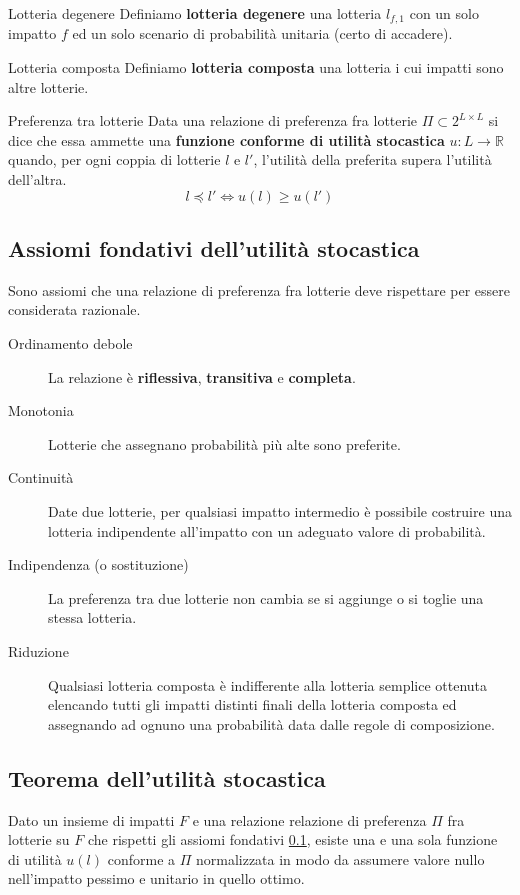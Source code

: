 \documentclass[\main/main.tex]{subfiles}
\begin{document}
\begin{definition}{Lotteria degenere}
  Definiamo \textbf{lotteria degenere} una lotteria $l_{f,1}$ con un solo impatto $f$ ed un solo scenario di probabilità unitaria (certo di accadere).
\end{definition}

\begin{definition}{Lotteria composta}
  Definiamo \textbf{lotteria composta} una lotteria i cui impatti sono altre lotterie.
\end{definition}

\begin{definition}{Preferenza tra lotterie}
  Data una relazione di preferenza fra lotterie $\Pi \subset 2^{L \times L}$ si dice che essa ammette una \textbf{funzione conforme di utilità stocastica} $u: L \rightarrow \mathbb{R}$ quando, per ogni coppia di lotterie $l$ e $l'$, l'utilità della preferita supera l'utilità dell'altra.
  \[
    l \preceq l' \Leftrightarrow u(l) \geq u(l')
  \]
\end{definition}

\subsection{Assiomi fondativi dell'utilità stocastica} \label{assiomi_fondativi}
Sono assiomi che una relazione di preferenza fra lotterie deve rispettare per essere considerata razionale.

\begin{description}
  \item[Ordinamento debole] La relazione è \textbf{riflessiva}, \textbf{transitiva} e \textbf{completa}.
  \item[Monotonia] Lotterie che assegnano probabilità più alte sono preferite.
  \item[Continuità] Date due lotterie, per qualsiasi impatto intermedio è possibile costruire una lotteria indipendente all'impatto con un adeguato valore di probabilità.
  \item[Indipendenza (o sostituzione)] La preferenza tra due lotterie non cambia se si aggiunge o si toglie una stessa lotteria.
  \item[Riduzione] Qualsiasi lotteria composta è indifferente alla lotteria semplice ottenuta elencando tutti gli impatti distinti finali della lotteria composta ed assegnando ad ognuno una probabilità data dalle regole di composizione.
\end{description}

\subsection{Teorema dell'utilità stocastica}
\begin{theorem}
  Dato un insieme di impatti $F$ e una relazione relazione di preferenza $\Pi$ fra lotterie su $F$ che rispetti gli assiomi fondativi \ref{assiomi_fondativi}, esiste una e una sola funzione di utilità $u(l)$ conforme a $\Pi$ normalizzata in modo da assumere valore nullo nell'impatto pessimo e unitario in quello ottimo.
\end{theorem}
\end{document}
